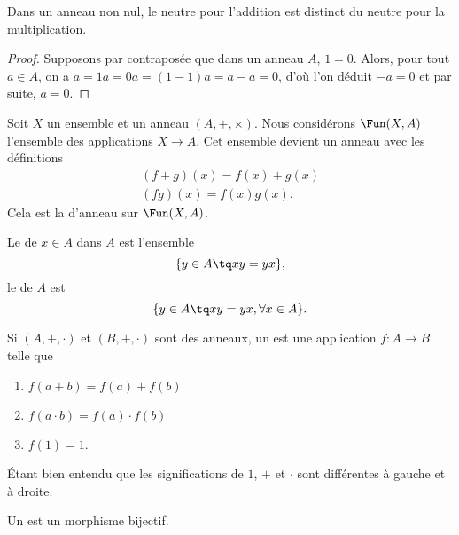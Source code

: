 \begin{proposition}     \label{PROPooNCCGooXjVyVt}
    Dans un anneau non nul, le neutre pour l'addition est distinct du neutre pour la multiplication.
\end{proposition}
\begin{proof}
    Supposons par contraposée que dans un anneau $A$, \( 1 = 0 \). Alors, pour tout \( a \in A \), on a \( a = 1a = 0a = (1 - 1)a = a - a=0 \), d'où l'on déduit \( -a = 0  \) et par suite, \( a = 0. \)
\end{proof}

Soit \( X\) un ensemble et un anneau $(A, +, \times)$. Nous considérons \( \Fun(X,A)\) l'ensemble des applications \( X\to A\). Cet ensemble devient un anneau avec les définitions
\begin{subequations}
    \begin{align}
        (f+g)(x)=f(x)+g(x)\\
        (fg)(x)=f(x)g(x).
    \end{align}
\end{subequations}
Cela est la  d'anneau sur \( \Fun(X,A)\).

Le  de \( x\in A\) dans \( A\) est l'ensemble
\begin{equation}
    \{ y\in A\tq xy=yx \},
\end{equation}
le  de \( A\) est
\begin{equation}
    \{ y\in A\tq xy=yx,\forall x\in A \}.
\end{equation}

\begin{definition}      \label{DEFooQBGJooKJqHXr}
    Si \( (A,+,\cdot)\) et \( (B,+,\cdot)\) sont des anneaux, un  est une application \( f\colon A\to B\) telle que
    \begin{enumerate}
        \item \( f(a+b)=f(a)+f(b)\)
        \item
            \( f(a\cdot b)=f(a)\cdot f(b)\)
        \item
            \( f(1)=1\).
    \end{enumerate}
    Étant bien entendu que les significations de \( 1\), $+$ et \( \cdot\) sont différentes à gauche et à droite.

    Un  est un morphisme bijectif.
\end{definition}



